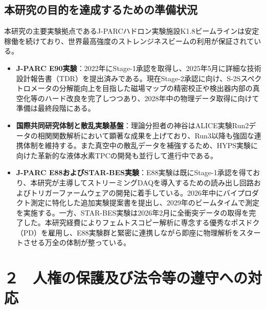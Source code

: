 \documentclass[11pt,a4j,dvipdfmx]{jarticle} 					%
\newcommand{\研究課題名}{加速器実験による短距離バリオン間相互作用の解明と中性子星ハイペロンパズルの解決}
\newcommand{\研究機関名}{東北大学}
\newcommand{\研究代表者氏名}{市川裕大}
\newcommand{\研究期間の最終元号年度}{13}  %
\begin{document}
\subsection{本研究の目的を達成するための準備状況}
本研究の主要実験拠点であるJ-PARCハドロン実験施設K1.8ビームラインは安定稼働を続けており、世界最高強度のストレンジネスビームの利用が保証されている。
\begin{itemize}
    \item \textbf{J-PARC E90実験}：2022年にStage-1承認を取得し、2025年5月に詳細な技術設計報告書（TDR）を提出済みである。現在Stage-2承認に向け、S-2Sスペクトロメータの分解能向上を目指した磁場マップの精密校正や検出器内部の真空化等のハード改良を完了しつつあり、2028年中の物理データ取得に向けて準備は最終段階にある。
    \item \textbf{国際共同研究体制と散乱実験基盤}：理論分担者の神谷はALICE実験Run2データの相関関数解析において顕著な成果を上げており、Run3以降も強固な連携体制を維持する。また真空中の散乱データを補強するため、HYPS実験に向けた革新的な液体水素TPCの開発も並行して進行中である。
    \item \textbf{J-PARC E88およびSTAR-BES実験}：E88実験は既にStage-1承認を得ており、本研究が主導してストリーミングDAQを導入するための読み出し回路およびトリガーファームウェアの開発に着手している。2026年中にバイプロダクト測定に特化した追加実験提案書を提出し、2029年のビームタイムで測定を実施する。一方、STAR-BES実験は2026年2月に全衝突データの取得を完了した。本研究経費によりフェムトスコピー解析に専念する優秀なポスドク（PD）を雇用し、E88実験群と緊密に連携しながら即座に物理解析をスタートさせる万全の体制が整っている。
\end{itemize}





\section{２　人権の保護及び法令等の遵守への対応}






\end{document}
